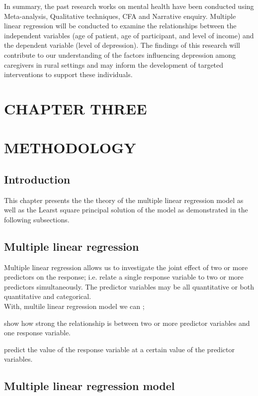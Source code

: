 \documentclass{article}
\numberwithin{equation}{section}
\begin{document}
	\noindent In summary, the past research works on mental health have been conducted using Meta-analysis, Qualitative techniques, CFA and Narrative enquiry. Multiple linear regression will be conducted to examine the relationships between the independent variables
	(age of patient, age of participant, and level of income) and the dependent
	variable (level of depression). The findings of this research will contribute to
	our understanding of the factors influencing depression among caregivers in rural
	settings and may inform the development of targeted interventions to support
	these individuals. 
\newpage
\section*{CHAPTER THREE}
\section*{METHODOLOGY}
\label{sec:methodology}
\setcounter{section}{3}
\setcounter{subsection}{0}

\subsection{Introduction}
This chapter presents the the theory of the multiple linear regression model as well as the Learst square principal solution of the model as demonstrated in the following subsections.
\subsection{Multiple linear regression}
Multiple linear regression allows us to investigate the joint effect of two or more  predictors on the response; i.e. relate a single response variable to two or more  predictors simultaneously. The predictor variables may be all quantitative or both quantitative and categorical.\\
With, multile linear regression model we can  ;

\begin{bracketedromanenum}
	\item show how strong the relationship is between two or more predictor variables and one response variable.
	\item predict the value of the response variable at a certain value of the predictor variables.
\end{bracketedromanenum}

\subsection{Multiple linear regression model}
\end{document}
